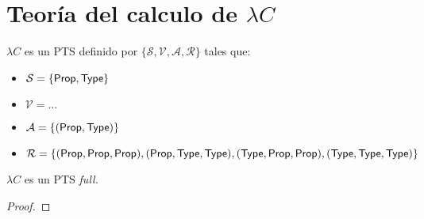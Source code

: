 \section{Teoría del calculo de $\lambda C$ }

\begin{definition}
$\lambda C$ es un PTS definido por $\{ \mathcal{S}, \mathcal{V}, \mathcal{A}, \mathcal{R}\}$ tales que:

\begin{itemize}
    \item{} $\mathcal{S} = \{\mathsf{Prop},\mathsf{Type}\}$
    \item{} $\mathcal{V} = \dots $
    \item{} $\mathcal{A} = \{(\mathsf{Prop}, \mathsf{Type})\}$
    \item{} $\mathcal{R} = \{(\mathsf{Prop}, \mathsf{Prop}, \mathsf{Prop}), (\mathsf{Prop}, \mathsf{Type}, \mathsf{Type}), (\mathsf{Type}, \mathsf{Prop}, \mathsf{Prop}), (\mathsf{Type}, \mathsf{Type}, \mathsf{Type})\}$
\end{itemize}

\end{definition}

\begin{lemma}
$\lambda C$ es un PTS \it{full}.
\end{lemma}
\begin{proof}
\end{proof}

